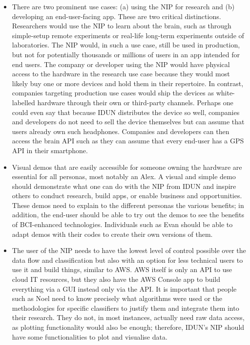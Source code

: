 \begin{itemize}
  \item There are two prominent use cases: (a) using the NIP for research and (b) developing an end-user-facing app. These are two critical distinctions. Researchers would use the NIP to learn about the brain, such as through simple-setup remote experiments or real-life long-term experiments outside of laboratories. The NIP would, in such a use case, still be used in production, but not for potentially thousands or millions of users in an app intended for end users. The company or developer using the NIP would have physical access to the hardware in the research use case because they would most likely buy one or more devices and hold them in their repertoire. In contrast, companies targeting production use cases would ship the devices as white-labelled hardware through their own or third-party channels. Perhaps one could even say that because IDUN distributes the device so well, companies and developers do not need to sell the device themselves but can assume that users already own such headphones. Companies and developers can then access the brain API such as they can assume that every end-user has a GPS API in their smartphone.
  \item Visual demos that are easily accessible for someone owning the hardware are essential for all personas, most notably an Alex. A visual and simple demo should demonstrate what one can do with the NIP from IDUN and inspire others to conduct research, build apps, or enable business and opportunities. These demos need to explain to the different personas the various benefits; in addition, the end-user should be able to try out the demos to see the benefits of BCI-enhanced technologies. Individuals such as Evan should be able to adapt demos with their codes to create their own versions of them.
  \item The user of the NIP needs to have the lowest level of control possible over the data flow and classification but also with an option for less technical users to use it and build things, similar to AWS. AWS itself is only an API to use cloud IT resources, but they also have the AWS Console app to build everything via a GUI instead only via the API. It is important that people such as Noel need to know precisely what algorithms were used or the methodologies for specific classifiers to justify them and integrate them into their research. They do not, in most instances, actually need raw data access, as plotting functionality would also be enough; therefore, IDUN’s NIP should have some functionalities to plot and visualise data.

\end{itemize}
